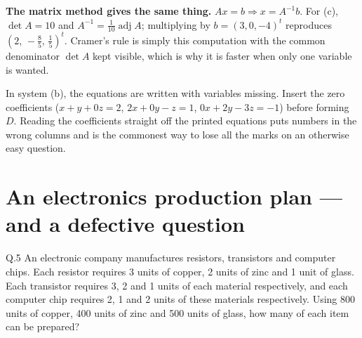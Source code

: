 \begin{solution}
\medskip
\textbf{The matrix method gives the same thing.} $Ax=b \Rightarrow x=A^{-1}b$.
For (c), $\det A=10$ and
$A^{-1}=\tfrac{1}{10}\operatorname{adj}A$; multiplying by
$b=(3,0,-4)^{t}$ reproduces $(2,\,-\tfrac85,\,\tfrac15)^{t}$. Cramer's rule is
simply this computation with the common denominator $\det A$ kept visible,
which is why it is faster when only one variable is wanted.

\end{solution}

\begin{pitfall}
In system (b), the equations are written with variables missing. Insert the
zero coefficients ($x+y+0z=2$, $2x+0y-z=1$, $0x+2y-3z=-1$) before forming
$D$. Reading the coefficients straight off the printed equations puts numbers
in the wrong columns and is the commonest way to lose all the marks on an
otherwise easy question.
\end{pitfall}

\section{An electronics production plan --- and a defective question}
\label{sec:u6q5}

\begin{question}{Q.5}
An electronic company manufactures resistors, transistors and computer chips.
Each resistor requires 3 units of copper, 2 units of zinc and 1 unit of glass.
Each transistor requires 3, 2 and 1 units of each material respectively, and
each computer chip requires 2, 1 and 2 units of these materials respectively.
Using 800 units of copper, 400 units of zinc and 500 units of glass, how many
of each item can be prepared?
\end{question}

